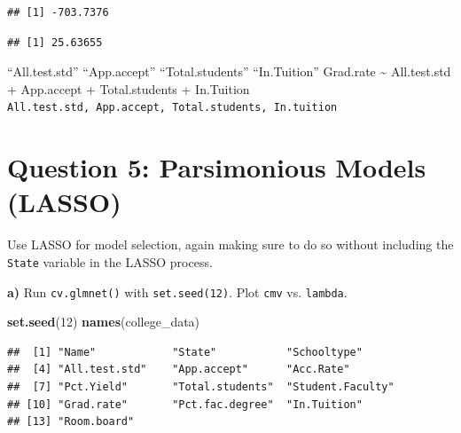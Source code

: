 \documentclass[]{article}
\newenvironment{Shaded}{\begin{snugshade}}{\end{snugshade}}
\newcommand{\KeywordTok}[1]{\textcolor[rgb]{0.13,0.29,0.53}{\textbf{#1}}}
\newcommand{\DataTypeTok}[1]{\textcolor[rgb]{0.13,0.29,0.53}{#1}}
\newcommand{\DecValTok}[1]{\textcolor[rgb]{0.00,0.00,0.81}{#1}}
\newcommand{\StringTok}[1]{\textcolor[rgb]{0.31,0.60,0.02}{#1}}
\newcommand{\CommentTok}[1]{\textcolor[rgb]{0.56,0.35,0.01}{\textit{#1}}}
\newcommand{\OperatorTok}[1]{\textcolor[rgb]{0.81,0.36,0.00}{\textbf{#1}}}
\newcommand{\NormalTok}[1]{#1}
\begin{document}
\begin{verbatim}
## [1] -703.7376
\end{verbatim}

\begin{Shaded}
\end{Shaded}

\begin{verbatim}
## [1] 25.63655
\end{verbatim}

``All.test.std'' ``App.accept'' ``Total.students'' ``In.Tuition''
Grad.rate \textasciitilde{} All.test.std + App.accept + Total.students +
In.Tuition
\texttt{All.test.std,\ App.accept,\ Total.students,\ In.tuition}

\section{Question 5: Parsimonious Models
(LASSO)}\label{question-5-parsimonious-models-lasso}

Use LASSO for model selection, again making sure to do so without
including the \texttt{State} variable in the LASSO process.

\textbf{a)} Run \texttt{cv.glmnet()} with \texttt{set.seed(12)}. Plot
\texttt{cmv} vs. \texttt{lambda}.

\begin{Shaded}
\begin{Highlighting}[]
\KeywordTok{set.seed}\NormalTok{(}\DecValTok{12}\NormalTok{)}
\KeywordTok{names}\NormalTok{(college_data)}
\end{Highlighting}
\end{Shaded}

\begin{verbatim}
##  [1] "Name"            "State"           "Schooltype"     
##  [4] "All.test.std"    "App.accept"      "Acc.Rate"       
##  [7] "Pct.Yield"       "Total.students"  "Student.Faculty"
## [10] "Grad.rate"       "Pct.fac.degree"  "In.Tuition"     
## [13] "Room.board"
\end{verbatim}

\begin{Shaded}
\end{Shaded}
\end{document}
